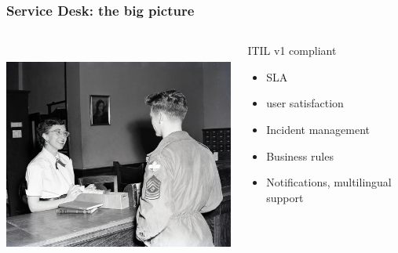 \documentclass{beamer}
\begin{document}
\begin{frame}


    \frametitle{Service Desk: the big picture}
 \begin{columns}
 \begin{column}{0.45\textwidth}
         \includegraphics[height=7.5cm]{./pics/servicedesk.jpg}
 \end{column}
 \begin{column}{0.45\textwidth}
    \begin{block}{ITIL v1 compliant}
        \begin{itemize}
            \item SLA
            \item user satisfaction
            \item Incident management
            \item Business rules
            \item Notifications, multilingual support
        \end{itemize}

    \end{block}

 \end{column}
\end{columns}
\end{frame}
\end{document}
